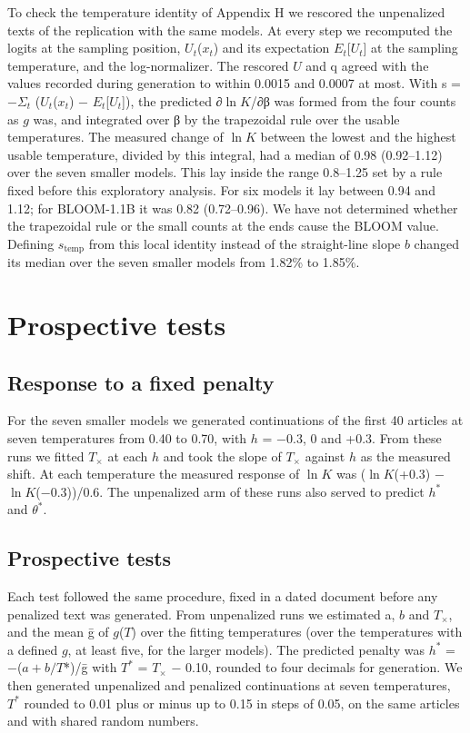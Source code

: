 \documentclass[aps,prx,onecolumn,superscriptaddress,longbibliography]{revtex4-2}
\begin{document}
To check the temperature identity of Appendix H we rescored the unpenalized texts of the replication with the same models. At every step we recomputed the logits at the sampling position, \(U_{t}\)(\(x_{t}\)) and its expectation \(E_{t}\){[}\(U_{t}\){]} at the sampling temperature, and the log-normalizer. The rescored \(U\) and q agreed with the values recorded during generation to within 0.0015 and 0.0007 at most. With s = −\(\Sigma_{t}\) (\(U_{t}\)(\(x_{t}\)) − \(E_{t}\){[}\(U_{t}\){]}), the predicted ∂\(\ln K\)/∂β was formed from the four counts as \(g\) was, and integrated over β by the trapezoidal rule over the usable temperatures. The measured change of \(\ln K\) between the lowest and the highest usable temperature, divided by this integral, had a median of 0.98 (0.92--1.12) over the seven smaller models. This lay inside the range 0.8--1.25 set by a rule fixed before this exploratory analysis. For six models it lay between 0.94 and 1.12; for BLOOM-1.1B it was 0.82 (0.72--0.96). We have not determined whether the trapezoidal rule or the small counts at the ends cause the BLOOM value. Defining \(s_{\mathrm{temp}}\) from this local identity instead of the straight-line slope \(b\) changed its median over the seven smaller models from 1.82\% to 1.85\%.

\section{Prospective tests}

\subsection{Response to a fixed penalty}

For the seven smaller models we generated continuations of the first 40 articles at seven temperatures from 0.40 to 0.70, with \(h\) = −0.3, 0 and +0.3. From these runs we fitted \(T_{\times}\) at each \(h\) and took the slope of \(T_{\times}\) against \(h\) as the measured shift. At each temperature the measured response of \(\ln K\) was (\(\ln K\)(+0.3) − \(\ln K\)(−0.3))/0.6. The unpenalized arm of these runs also served to predict \(h^*\) and \(\theta^*\).

\subsection{Prospective tests}

Each test followed the same procedure, fixed in a dated document before any penalized text was generated. From unpenalized runs we estimated a, \(b\) and \(T_{\times}\), and the mean ḡ of \(g\)(\(T\)) over the fitting temperatures (over the temperatures with a defined \(g\), at least five, for the larger models). The predicted penalty was \(h^*\) = −(\(a+b/T\)*)/ḡ with \(T^*\) = \(T_{\times}\) − 0.10, rounded to four decimals for generation. We then generated unpenalized and penalized continuations at seven temperatures, \(T^*\) rounded to 0.01 plus or minus up to 0.15 in steps of 0.05, on the same articles and with shared random numbers.
\end{document}
